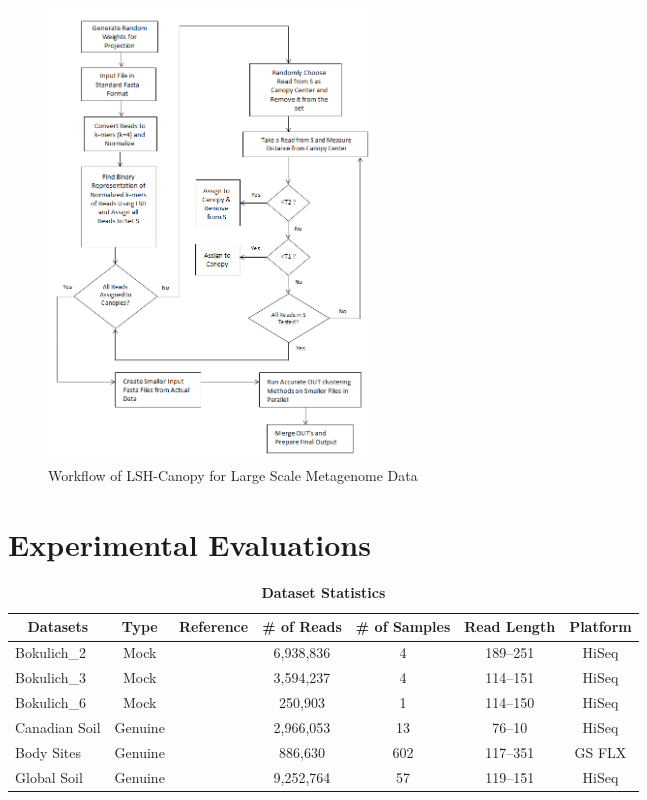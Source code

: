 \documentclass[10pt, conference, compsocconf]{IEEEtran}
\begin{document}
\begin{figure}
	\centering
	\includegraphics[width=\linewidth,height=12cm]{flowchart.png}	
	\caption{Workflow of LSH-Canopy for Large Scale Metagenome Data}
	\label{fig:flowchart}
\end{figure}


\section{Experimental Evaluations}
\begin{table}[tb] 
\centering 
\caption{\textbf{Dataset Statistics}} \label{table:finaltabledataset} 
\begin{tabular}{|l| c c c c c c|} 
\hline
\multicolumn{1}{|c|}{{\bf{Datasets}}} & \multicolumn{1}{c}{{\bf{Type}}} & {\bf{Reference}} & {\bf{\# of Reads}} & {\bf{\# of Samples}} & {\bf{Read Length}} & {\bf{Platform}}\\
\hline
{Bokulich\_2} & Mock & \cite{MARmockDatasetRef} & 6,938,836 & 4 & 189--251 & HiSeq\\
{Bokulich\_3} & Mock & \cite{MARmockDatasetRef} & 3,594,237 & 4 & 114--151 & HiSeq\\
{Bokulich\_6} & Mock & \cite{MARmockDatasetRef} & 250,903 & 1 & 114--150 & HiSeq\\
{Canadian Soil} & Genuine & \cite{MARcanadianSoil} & 2,966,053 & 13 & 76--10 & HiSeq\\
{Body Sites} & Genuine & \cite{MARbodySites} & 886,630 & 602 & 117--351 & GS FLX\\
{Global Soil} & Genuine & \cite{MARglobalSoil} & 9,252,764 & 57 & 119--151 & HiSeq\\
\hline
\end{tabular}
\end{table} 
\end{document}
